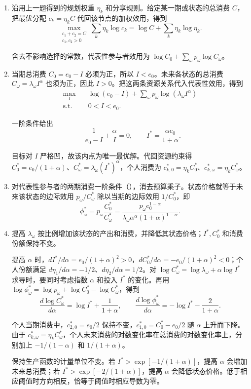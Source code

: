 \begin{solution}[blank-type=manual,blank-vsep=9\baselineskip]

\begin{enumerate}[label=(\alph*)]
\item 沿用上一题得到的规划权重 $\eta_k$ 和分享规则。给定某一期或状态的总消费 $C$，把最优分配 $c_k=\eta_k C$ 代回该节点的加权效用，得到
\[
 \max_{\substack{c_1+c_2=C\\c_1,c_2>0}}\sum_k\eta_k\log c_k
 =\log C+\sum_k\eta_k\log\eta_k.
\]

舍去不影响选择的常数，代表性参与者效用为 $\log C_0+\sum_\omega p_\omega\log C_\omega$。
\item 当期总消费 $C_0=e_0-I$ 必须为正，所以 $I<e_0$。未来各状态的总消费 $C_\omega=\lambda_\omega I^\alpha$ 也须为正，因此 $I>0$。把这两条资源关系代入代表性效用，得到
\[
 \begin{aligned}
 \max_I\quad &\log(e_0-I)+\sum_\omega p_\omega\log(\lambda_\omega I^\alpha)\\
 \text{s.t.}\quad &0<I<e_0.
 \end{aligned}
\]

一阶条件给出
\[
 -\frac1{e_0-I}+\frac\alpha I=0,
 \qquad I^*=\frac{\alpha e_0}{1+\alpha}.
\]

目标对 $I$ 严格凹，故该内点为唯一最优解。代回资源约束得 $C_0^*=e_0/(1+\alpha)$、$C_\omega^*=\lambda_\omega(I^*)^\alpha$，个人消费为 $c_{k,0}^*=\eta_k C_0^*$、$c_{k,\omega}^*=\eta_k C_\omega^*$。
\item 对代表性参与者的两期消费一阶条件\ifdefined\WJHandoutKnowledge（）\fi，消去预算乘子。状态价格就等于未来该状态的边际效用 $p_\omega/C_\omega^*$ 除以当期的边际效用 $1/C_0^*$，即
\[
 \phi_\omega^*=p_\omega\frac{C_0^*}{C_\omega^*}
 =\frac{p_\omega e_0^{1-\alpha}}
 {\lambda_\omega\alpha^\alpha(1+\alpha)^{1-\alpha}}.
\]
\item 提高 $\lambda_\omega$ 按比例增加该状态的产出和消费，并降低其状态价格；$I^*,C_0^*$ 和消费份额保持不变。

提高 $\alpha$ 时，$dI^*/d\alpha=e_0/(1+\alpha)^2>0$，$dC_0^*/d\alpha=-e_0/(1+\alpha)^2<0$；个人份额满足 $d\eta_1/d\alpha=-1/2$、$d\eta_2/d\alpha=1/2$。对 $\log C_\omega^*=\log\lambda_\omega+\alpha\log I^*$ 求导时，要同时考虑指数 $\alpha$ 和投入 $I^*$ 的变化。再用 $\log\phi_\omega^*=\log p_\omega+\log C_0^*-\log C_\omega^*$，得到
\[
 \frac{d\log C_\omega^*}{d\alpha}=\log I^*+\frac1{1+\alpha},\qquad
 \frac{d\log\phi_\omega^*}{d\alpha}=-\log I^*-\frac2{1+\alpha}.
\]

个人当期消费中，$c_{2,0}^*=e_0/2$ 保持不变，$c_{1,0}^*=C_0^*-e_0/2$ 随 $\alpha$ 上升而下降。由于 $c_{k,\omega}^*=\eta_k C_\omega^*$，个人未来消费的对数变化率在总消费的对数变化率上，分别加上 $-1/(1-\alpha)$ 和 $1/(1+\alpha)$。

保持生产函数的计量单位不变。若 $I^*>\exp[-1/(1+\alpha)]$，提高 $\alpha$ 会增加未来总消费；若 $I^*>\exp[-2/(1+\alpha)]$，提高 $\alpha$ 会降低状态价格。低于相应阈值时方向相反，恰等于阈值时相应导数为零。\qedhere
\end{enumerate}
\end{solution}


